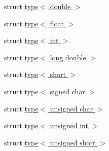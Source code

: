 \begin{DoxyCompactItemize}
\item 
struct \hyperlink{structcimg__library__suffixed_1_1cimg_1_1type_3_01double_01_4}{type$<$ double $>$}
\item 
struct \hyperlink{structcimg__library__suffixed_1_1cimg_1_1type_3_01float_01_4}{type$<$ float $>$}
\item 
struct \hyperlink{structcimg__library__suffixed_1_1cimg_1_1type_3_01int_01_4}{type$<$ int $>$}
\item 
struct \hyperlink{structcimg__library__suffixed_1_1cimg_1_1type_3_01long_01double_01_4}{type$<$ long double $>$}
\item 
struct \hyperlink{structcimg__library__suffixed_1_1cimg_1_1type_3_01short_01_4}{type$<$ short $>$}
\item 
struct \hyperlink{structcimg__library__suffixed_1_1cimg_1_1type_3_01signed_01char_01_4}{type$<$ signed char $>$}
\item 
struct \hyperlink{structcimg__library__suffixed_1_1cimg_1_1type_3_01unsigned_01char_01_4}{type$<$ unsigned char $>$}
\item 
struct \hyperlink{structcimg__library__suffixed_1_1cimg_1_1type_3_01unsigned_01int_01_4}{type$<$ unsigned int $>$}
\item 
struct \hyperlink{structcimg__library__suffixed_1_1cimg_1_1type_3_01unsigned_01short_01_4}{type$<$ unsigned short $>$}
\end{DoxyCompactItemize}
